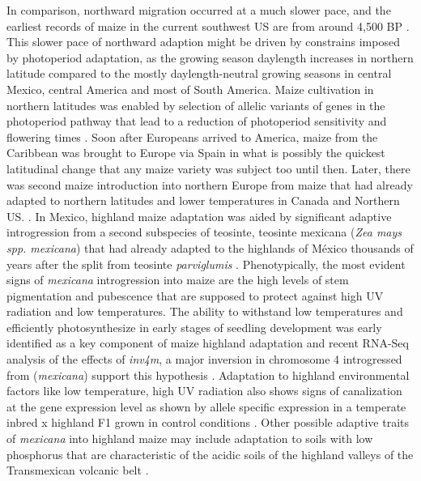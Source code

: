 \documentclass[9pt,twocolumn,twoside,lineno]{gsajnl}
\begin{document}
In comparison, northward migration occurred at a much slower pace, and the earliest records of maize in the current southwest US are from around 4,500 BP \citep{Da_Fonseca2015-zh, Swarts2017-ge}. 
This slower pace of northward adaption might be driven by constrains imposed by photoperiod adaptation, as the growing season daylength increases in northern latitude compared to the mostly daylength-neutral growing seasons in central Mexico, central America and most of South America.  
Maize cultivation in northern latitudes was enabled by selection of allelic variants of genes in the photoperiod pathway that lead to a reduction of photoperiod sensitivity and flowering times \citep{Liang2018-af, Guo2018-on, Coles2010-db, Huang2018-ga, Yang2013-lg, Salvi2007-ku, Wang2017-bc, Hung2012-ms}.
Soon after Europeans arrived to America, maize from the Caribbean was brought to Europe via Spain \citep{Brandolini1968-eu, Brandenburg2017-ii} in what is possibly the quickest latitudinal change that any maize variety was subject too until then. 
Later, there was second maize introduction into northern Europe from maize that had already adapted to northern latitudes and lower temperatures in Canada and Northern US. \citep{Brandenburg2017-ii}. 
In Mexico, highland maize adaptation was aided by significant adaptive introgression from a second subspecies of teosinte, teosinte mexicana (\textit{Zea mays spp. mexicana}) that had already adapted to the highlands of México thousands of years after the split from teosinte \textit{parviglumis} \citep{Hufford2013-gs, Gonzalez-Segovia2019-jy}. 
Phenotypically, the most evident signs of \textit{mexicana} introgression into maize are the high levels of stem pigmentation and pubescence \citep{Lauter2004-eq} that are supposed to protect against high UV radiation and low temperatures. 
The ability to withstand low temperatures and efficiently photosynthesize in early stages of seedling development was early identified as a key component of maize highland adaptation \citep{Hardacre1980-tq} and recent RNA-Seq analysis of the effects of \textit{inv4m}, a major inversion in chromosome 4 introgressed from (\textit{mexicana}) support this hypothesis \cite{Crow2020-gene}. 
Adaptation to highland environmental factors like low temperature, high UV radiation also shows signs of canalization at the gene expression level as shown by allele specific expression in a temperate inbred x highland F1 grown in control conditions \cite{Aguilar-Rangel2017-rm}.
Other possible adaptive traits of \textit{mexicana} into highland maize may include adaptation to soils with low phosphorus \citep{AguirreLiguori2019-fl, Fustier2017-sl} that are characteristic of the acidic soils of the highland valleys of the Transmexican volcanic belt \citep{Krasilnikov2013-sm}.
\end{document}
